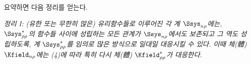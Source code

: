 
요약하면 다음 정리를 얻는다.

\emph{정리 I: (유한 또는 무한히 많은) 유리함수들로 이루어진 각 계 $\Ssys_{n\rho}$에는, $\Ssys^*_{\rho\rho}$의 함수들 사이에 성립하는 모든 관계가 $\Ssys_{n\rho}$에서도 보존되고 그 역도 성립하도록, 계 $\Ssys^*_{\rho\rho}$를 임의로 많은 방식으로 일대일 대응시킬 수 있다. 이때 체(體) $\Kfield_{n\rho}$에는 (4)에 따라 특히 다시 체(體) $\Kfield^*_{\rho\rho}$가 대응한다.}
